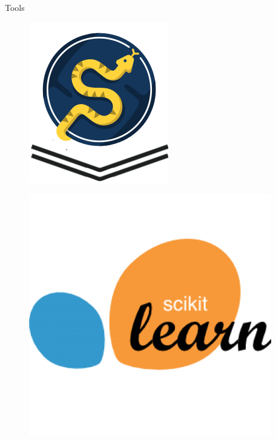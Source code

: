 \documentclass[xcolor=x11names,compress]{beamer}
\renewcommand{\(}{\begin{columns}}
\renewcommand{\)}{\end{columns}}
\newcommand{\<}[1]{\begin{column}{#1}}
\renewcommand{\>}{\end{column}}
\begin{document}
\begin{frame}{Tools}
\begin{itemize}
{                    \begin{figure}
                    \centering
                    \begin{minipage}{.17\textwidth}
                    \includegraphics[width=\linewidth]{scipy.png}
                    \label{fig:test1}
                    \end{minipage}\hfill
                    \begin{minipage}{.2\textwidth}
                    \includegraphics[width=\linewidth]{scikit.png}
                    \label{fig:test2}
                    \end{minipage}\hfill


\end{figure}}
\end{itemize}
\end{frame}
\end{document}
